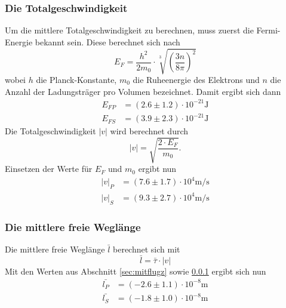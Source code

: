     \subsubsection{Die Totalgeschwindigkeit}
    \label{sec:totgeschw}
      Um die mittlere Totalgeschwindigkeit zu berechnen, muss zuerst die Fermi-Energie bekannt sein. Diese berechnet sich nach
      \begin{equation}
        E_{F} = \frac{h^{2}}{2m_{0}} \cdot \sqrt[3]{\left(\frac{3n}{8 \pi}\right)^{2}}
      \end{equation}
      wobei $h$ die Planck-Konstante, $m_{0}$ die Ruheenergie des Elektrons und $n$ die Anzahl der Ladungsträger pro Volumen bezeichnet. Damit ergibt sich dann
      \begin{align}
        E_{FP} & = (2.6 \pm 1.2) \cdot 10^{-21} \si{\joule} \\
        E_{FS} & = (3.9 \pm 2.3) \cdot 10^{-21} \si{\joule}
      \end{align}
      Die Totalgeschwindigkeit $|v|$ wird berechnet durch
      \begin{equation}
        |v| = \sqrt{\frac{2 \cdot E_{F}}{m_{0}}}.
      \end{equation}
      Einsetzen der Werte für $E_{F}$ und $m_{0}$ ergibt nun
      \begin{align}
        |v|_{P} & = (7.6 \pm 1.7)\cdot 10^{4} \si{\meter\per\second}\\
        |v|_{S} & = (9.3 \pm 2.7)\cdot 10^{4} \si{\meter\per\second}
      \end{align}
    \subsubsection{Die mittlere freie Weglänge}
      Die mittlere freie Weglänge $\bar{l}$ berechnet sich mit
      \begin{equation}
        \bar{l} = \bar{\tau} \cdot |v|
      \end{equation}
      Mit den Werten aus Abschnitt \ref{sec:mitflugz} sowie \ref{sec:totgeschw} ergibt sich nun
      \begin{align}
        \bar{l_{P}} & = (-2.6 \pm 1.1)\cdot 10^{-8}  \si{\meter} \\
        \bar{l_{S}} & = (-1.8 \pm 1.0)\cdot 10^{-8}  \si{\meter}
      \end{align}
